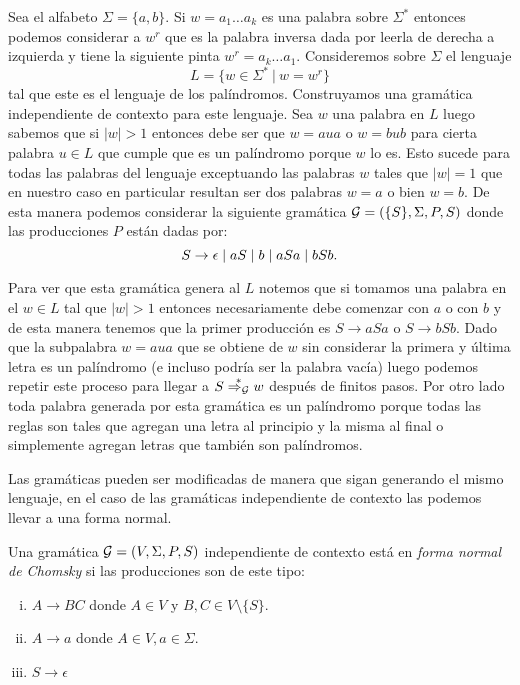 \documentclass[tesis.tex]{subfiles}
\begin{document}
\begin{ej}\label{leng_ej_gram_palindromos}
	Sea el alfabeto $\Sigma = \{ a,b \}$. Si $w=a_1 \dots a_k$ es una palabra sobre $\Sigma^*$ entonces podemos considerar a $w^r$ que es la palabra inversa dada por leerla de derecha a izquierda y tiene la siguiente pinta $w^r= a_k \dots a_1$. 
	Consideremos sobre $\Sigma$ el lenguaje 
	\[
	L = \{ w \in \Sigma^* \ | \ w = w^r  \}
	\]
	tal que este es el lenguaje de los palíndromos. 
	Construyamos una gramática independiente de contexto para este lenguaje.
	Sea $w$ una palabra en $L$ luego sabemos que si $|w| > 1$ entonces debe ser que $w = a u a$ o $w = b u b$ para cierta palabra $u \in L$ que cumple que es un palíndromo porque $w$ lo es. 
	Esto sucede para todas las palabras del lenguaje exceptuando las palabras $w$ tales que $|w|=1$ que en nuestro caso en particular resultan ser dos palabras $w=a$ o bien $w = b$. 
	De esta manera podemos considerar la siguiente gramática ${\cal G}  =  (\{S\}, \Sigma, P, S )$ donde las producciones $P$ están dadas por:
	\begin{equation*}
		S  \to \epsilon \\ \mid a \\ S  \mid  b \\ \mid aSa \\ \mid bSb. \\
	\end{equation*}

	Para ver que esta gramática genera al $L$ notemos que si tomamos una palabra en el $w \in L$ tal que $|w| > 1$ entonces necesariamente debe comenzar con $a$ o con $b$ y de esta manera tenemos que la primer producción es $S \to aSa$ o $S \to bSb$. 
	Dado que la subpalabra $w = aua$ que se obtiene de $w$ sin considerar la primera y última letra es un palíndromo (e incluso podría ser la palabra vacía) luego podemos repetir este proceso para llegar a $S \overset{*}{\Rightarrow_{\cal G}} w$ después de finitos pasos. 
	Por otro lado toda palabra generada por esta gramática es un palíndromo porque todas las reglas son tales que agregan una letra al principio y la misma al final o simplemente agregan letras que también son palíndromos.
\end{ej}

Las gramáticas pueden ser modificadas de manera que sigan generando el mismo lenguaje, en el caso de las gramáticas independiente de contexto las podemos llevar a una forma normal.

\begin{deff}
	Una gramática ${\cal G} = (V, \Sigma, P, S)$ independiente de contexto está en \emph{forma normal de Chomsky} si las producciones son de este tipo:
	\begin{enumerate}[i)]
		\item $A \to BC$ donde $A\in V$ y $B,C \in V \setminus \{ S \}$.
		\item $A \to a$ donde $A \in V, a \in \Sigma$.
		\item $S \to \epsilon$ 
	\end{enumerate}
\end{deff}
\end{document}
